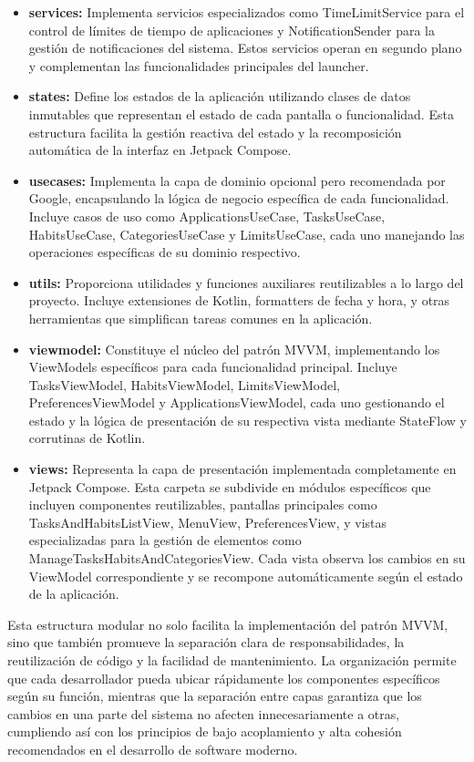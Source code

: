 \begin{itemize}
    \item \textbf{services:} Implementa servicios especializados como TimeLimitService para el control de límites de tiempo de aplicaciones y NotificationSender para la gestión de notificaciones del sistema. Estos servicios operan en segundo plano y complementan las funcionalidades principales del launcher.
    
    \item \textbf{states:} Define los estados de la aplicación utilizando clases de datos inmutables que representan el estado de cada pantalla o funcionalidad. Esta estructura facilita la gestión reactiva del estado y la recomposición automática de la interfaz en Jetpack Compose.
    
    \item \textbf{usecases:} Implementa la capa de dominio opcional pero recomendada por Google, encapsulando la lógica de negocio específica de cada funcionalidad. Incluye casos de uso como ApplicationsUseCase, TasksUseCase, HabitsUseCase, CategoriesUseCase y LimitsUseCase, cada uno manejando las operaciones específicas de su dominio respectivo.
    
    \item \textbf{utils:} Proporciona utilidades y funciones auxiliares reutilizables a lo largo del proyecto. Incluye extensiones de Kotlin, formatters de fecha y hora, y otras herramientas que simplifican tareas comunes en la aplicación.
    
    \item \textbf{viewmodel:} Constituye el núcleo del patrón MVVM, implementando los ViewModels específicos para cada funcionalidad principal. Incluye TasksViewModel, HabitsViewModel, LimitsViewModel, PreferencesViewModel y ApplicationsViewModel, cada uno gestionando el estado y la lógica de presentación de su respectiva vista mediante StateFlow y corrutinas de Kotlin.
    
    \item \textbf{views:} Representa la capa de presentación implementada completamente en Jetpack Compose. Esta carpeta se subdivide en módulos específicos que incluyen componentes reutilizables, pantallas principales como TasksAndHabitsListView, MenuView, PreferencesView, y vistas especializadas para la gestión de elementos como ManageTasksHabitsAndCategoriesView. Cada vista observa los cambios en su ViewModel correspondiente y se recompone automáticamente según el estado de la aplicación.
\end{itemize}

Esta estructura modular no solo facilita la implementación del patrón MVVM, sino que también promueve la separación clara de responsabilidades, la reutilización de código y la facilidad de mantenimiento. La organización permite que cada desarrollador pueda ubicar rápidamente los componentes específicos según su función, mientras que la separación entre capas garantiza que los cambios en una parte del sistema no afecten innecesariamente a otras, cumpliendo así con los principios de bajo acoplamiento y alta cohesión recomendados en el desarrollo de software moderno.